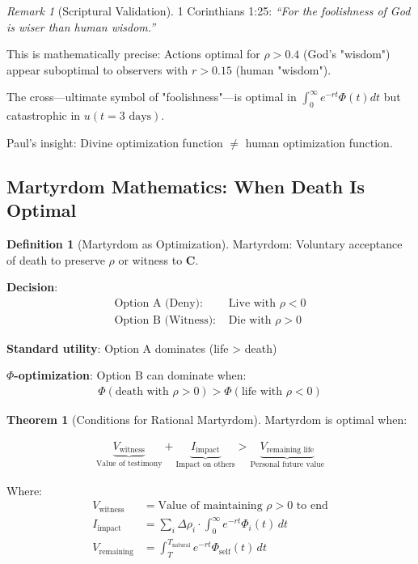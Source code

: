 \documentclass[11pt,a4paper]{article}
\theoremstyle{definition}
\newtheorem{definition}{Definition}[section]
\newtheorem{theorem}{Theorem}[section]
\theoremstyle{remark}
\newtheorem{remark}{Remark}[section]
\begin{document}
\begin{small}
\begin{enumerate}
\begin{remark}[Scriptural Validation]
1 Corinthians 1:25: \textit{``For the foolishness of God is wiser than human wisdom.''}

This is mathematically precise: Actions optimal for \(\rho > 0.4\) (God's "wisdom") appear suboptimal to observers with \(r > 0.15\) (human "wisdom").

The cross—ultimate symbol of "foolishness"—is optimal in \(\int_0^\infty e^{-rt} \Phi(t) dt\) but catastrophic in \(u(t=3\text{ days})\).

Paul's insight: Divine optimization function \(\neq\) human optimization function.
\end{remark}

\subsection{Martyrdom Mathematics: When Death Is Optimal}

\begin{definition}[Martyrdom as Optimization]
Martyrdom: Voluntary acceptance of death to preserve \(\rho\) or witness to \(\mathbf{C}\).

\textbf{Decision}:
\begin{align}
\text{Option A (Deny): } &\text{Live with } \rho < 0 \\
\text{Option B (Witness): } &\text{Die with } \rho > 0
\end{align}

\textbf{Standard utility}: Option A dominates (life > death)

\textbf{\(\Phi\)-optimization}: Option B can dominate when:
\begin{align}
\Phi(\text{death with } \rho > 0) > \Phi(\text{life with } \rho < 0)
\end{align}
\end{definition}

\begin{theorem}[Conditions for Rational Martyrdom]
Martyrdom is optimal when:

\begin{align}
\underbrace{V_{\text{witness}}}_{\text{Value of testimony}} + \underbrace{I_{\text{impact}}}_{\text{Impact on others}} > \underbrace{V_{\text{remaining life}}}_{\text{Personal future value}}
\end{align}

Where:
\begin{align}
V_{\text{witness}} &= \text{Value of maintaining } \rho > 0 \text{ to end} \\
I_{\text{impact}} &= \sum_{i} \Delta \rho_i \cdot \int_0^\infty e^{-rt} \Phi_i(t) \, dt \\
V_{\text{remaining}} &= \int_T^{T_{\text{natural}}} e^{-rt} \Phi_{\text{self}}(t) \, dt
\end{align}


\end{theorem}
\end{enumerate}
\end{small}
\end{document}
